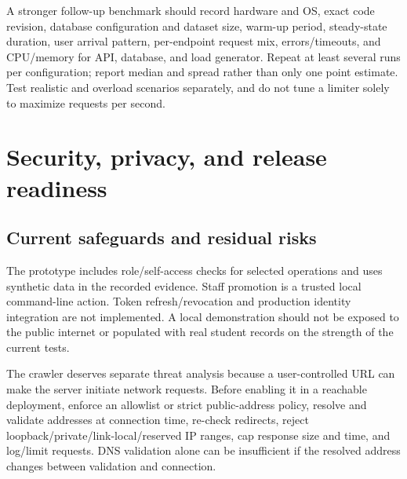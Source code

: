 \documentclass[11pt,a4paper,oneside]{report}
\begin{document}
A stronger follow-up benchmark should record hardware and OS, exact code revision, database configuration and dataset size, warm-up period, steady-state duration, user arrival pattern, per-endpoint request mix, errors/timeouts, and CPU/memory for API, database, and load generator. Repeat at least several runs per configuration; report median and spread rather than only one point estimate. Test realistic and overload scenarios separately, and do not tune a limiter solely to maximize requests per second.

\chapter{Security, privacy, and release readiness}
\section{Current safeguards and residual risks}
The prototype includes role/self-access checks for selected operations and uses synthetic data in the recorded evidence. Staff promotion is a trusted local command-line action. Token refresh/revocation and production identity integration are not implemented. A local demonstration should not be exposed to the public internet or populated with real student records on the strength of the current tests.

The crawler deserves separate threat analysis because a user-controlled URL can make the server initiate network requests. Before enabling it in a reachable deployment, enforce an allowlist or strict public-address policy, resolve and validate addresses at connection time, re-check redirects, reject loopback/private/link-local/reserved IP ranges, cap response size and time, and log/limit requests. DNS validation alone can be insufficient if the resolved address changes between validation and connection.
\end{document}
